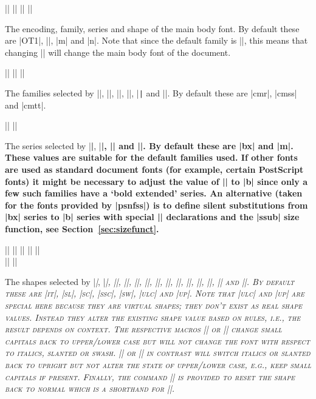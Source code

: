 \documentclass{ltxguide}[1995/11/28]
\begin{document}
\begin{decl}
  |\encodingdefault| \qquad
  |\familydefault|   \qquad
  |\seriesdefault|   \qquad
  |\shapedefault|
\end{decl}
The encoding, family, series and shape of the main body font.  By
default these are |OT1|, |\rmdefault|, |m| and |n|.  Note that since the
default family is |\rmdefault|, this means that changing |\rmdefault|
will change the main body font of the document.

\begin{decl}
  |\rmdefault| \qquad
  |\sfdefault| \qquad
  |\ttdefault|
\end{decl}
The families selected by |\textrm|, |\rmfamily|, |\textsf|, |\sffamily|,
|\texttt| and |\ttfamily|.  By default these are |cmr|, |cmss| and
|cmtt|.

\begin{decl}
  |\bfdefault| \qquad
  |\mddefault|
\end{decl}
The series selected by |\textbf|, |\bfseries|, |\textmd| and
|\mdseries|.  By default these are |bx| and |m|.  These values are
suitable for the default families used. If other fonts are used as
standard document fonts (for example, certain PostScript fonts) it might
be necessary to adjust the value of |\bfdefault| to |b| since only a few
such families have a `bold extended' series.  An alternative (taken for
the fonts provided by |psnfss|) is to define silent substitutions from
|bx| series to |b| series with special |\DeclareFontShape| declarations
and the |ssub| size function, see Section~\ref{sec:sizefunct}.

\begin{decl}
  |\itdefault|  \qquad
  |\sldefault|  \qquad
  |\scdefault|  \qquad
  |\sscdefault| \qquad
  |\swdefault|  \\
  |\ulcdefault| \qquad
  |\updefault|
\end{decl}
The shapes selected by |\textit|, |\itshape|, |\textsl|, |\slshape|,
|\textsc|, |\scshape|, |\textssc|, |\sscshape|, |\textsw|, |\swshape|,
|\textulc|, |\ulcshape|, |\textup| and |\upshape|.  By default these are
|it|, |sl|, |sc|, |ssc|, |sw|, |ulc| and |up|.  Note that |ulc| and |up| are special here
because they are virtual shapes; they don't exist as real shape values. Instead they alter
the existing shape value based on rules, i.e., the result depends on context. The
respective macros |\textulc| or |\ulcshape| change small capitals back
to upper/lower case but will not change the font with respect to
italics, slanted or swash.  |\upshape| or |\textup| in contrast will
switch italics or slanted back to upright but not alter the state of
upper/lower case, e.g., keep small capitals if present.  Finally, the
command |\normalshape| is provided to reset the shape back to normal
which is a shorthand for |\upshape\ulcshape|.
\end{document}
